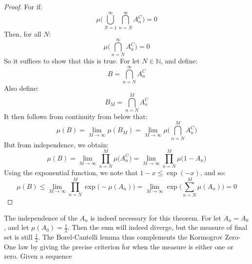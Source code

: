     \begin{proof}
        For if:
        \begin{equation}
            \mu\Big(\bigcup_{N=1}^{\infty}\bigcap_{n=N}^{\infty}
                A_{n}^{C}\big)=0
        \end{equation}
        Then, for all $N$:
        \begin{equation}
            \mu\Big(\bigcap_{n=N}^{\infty}A_{n}^{C}\Big)=0
        \end{equation}
        So it suffices to show that this is true. For let
        $N\in\mathbb{N}$, and define:
        \begin{equation}
            B=\bigcap_{n=N}^{\infty}A_{n}^{C}
        \end{equation}
        Also define:
        \begin{equation}
            B_{M}=\bigcap_{n=N}^{M}A_{n}^{C}
        \end{equation}
        It then follows from continuity from below that:
        \begin{equation}
            \mu(B)=\underset{M\rightarrow\infty}{\lim}\mu(B_{M})
            =\underset{M\rightarrow\infty}{\lim}
                \mu\Big(\bigcap_{n=N}^{M}A_{n}^{C}\Big)
        \end{equation}
        But from independence, we obtain:
        \begin{equation}
            \mu(B)=\underset{M\rightarrow\infty}{\lim}
                \prod_{n=N}^{M}\mu\big(A_{n}^{C}\big)
            =\underset{M\rightarrow\infty}{\lim}
                \prod_{n=N}^{M}\mu\big(1-A_{n}\big)
        \end{equation}
        Using the exponential function, we note that
        $1-x\leq\exp(\minus{x})$, and so:
        \begin{equation}
            \mu(B)\leq               
            \underset{M\rightarrow\infty}{\lim}
                \prod_{n=N}^{M}\exp\big(\minus\mu(A_{n})\big)
            =\underset{M\rightarrow\infty}{\lim}
                \exp\Big(\sum_{n=N}^{M}\mu(A_{n})\Big)=0
        \end{equation}
    \end{proof}
    The independence of the $A_{n}$ is indeed necessary for
    this theorem. For let $A_{n}=A_{0}$, and let
    $\mu(A_{0})=\frac{1}{2}$. Then the sum will indeed
    diverge, but the measure of final set is still
    $\frac{1}{2}$.
    The Borel-Cantelli lemma thus complements the
    Kormogrov Zero-One law by giving the precise criterion for
    when the measure is either one or zero. Given a sequence
